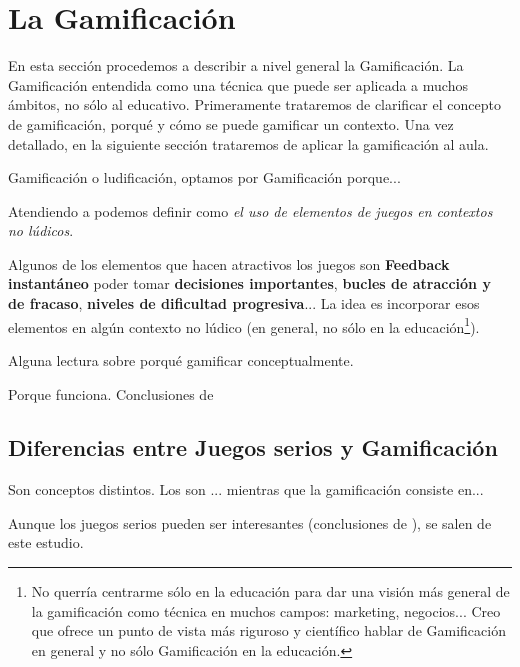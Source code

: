 
\section{La Gamificación}


En esta sección procedemos a describir a nivel general la Gamificación. 
%
La Gamificación entendida como una técnica que puede ser aplicada a muchos ámbitos, no sólo al educativo. 
%
Primeramente trataremos de clarificar el concepto de gamificación, porqué y cómo se puede gamificar un contexto.
%
Una vez detallado, en la siguiente sección trataremos de aplicar la gamificación al aula.




Gamificación o ludificación, optamos por Gamificación porque...

Atendiendo a \cite{GamificationDef} podemos definir  como \textit{el uso de elementos de juegos en contextos no lúdicos}. 

Algunos de los elementos que hacen atractivos los juegos son
\textbf{Feedback instantáneo}
poder tomar \textbf{decisiones importantes},
\textbf{bucles de atracción y de fracaso},
\textbf{niveles de dificultad progresiva}... La idea es incorporar esos elementos en algún contexto no lúdico (en general, no sólo en la educación\footnote{No querría centrarme sólo en la educación para dar una visión más general de la gamificación como técnica en muchos campos: marketing, negocios... Creo que ofrece un punto de vista más riguroso y científico hablar de Gamificación en general y no sólo Gamificación en la educación.}).



Alguna lectura sobre porqué gamificar conceptualmente.

Porque funciona. Conclusiones de \cite{EmpiricalGamification}


\subsection{Diferencias entre Juegos serios y Gamificación}

Son conceptos distintos. Los  son \cite{GamificationDef}... mientras que la gamificación consiste en...

Aunque los juegos serios pueden ser interesantes (conclusiones de \cite{MetaSerious}), se salen de este estudio.


